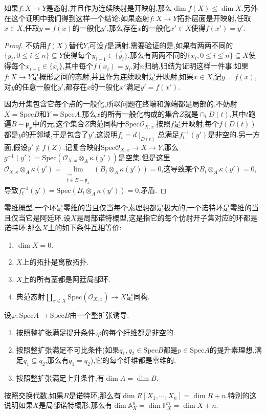 \item 如果$f:X\to Y$是态射,并且作为连续映射是开映射,那么$\dim f(X)\le\dim X$.另外在这个证明中我们得到这样一个结论:如果态射$f:X\to Y$拓扑层面是开映射,任取$x\in X$,任取$y=f(x)$的一般化$y'$,那么存在$x$的一般化$x'\in X$使得$f(x')=y'$.
\begin{proof}
	
	不妨用$f(X)$替代$Y$,可设$f$是满射.需要验证的是,如果有两两不同的$\{y_i,0\le i\le n\}\subseteq Y$使得每个$y_{i-1}\in\overline{\{y_i\}}$,那么有两两不同的$\{x_i,0\le i\le n\}\subseteq X$使得每个$x_{i-1}\in\overline{\{x_i\}}$,其中每个$f(x_i)=y_i$.对$n$归纳,归结为证明这样一件事:如果$f:X\to Y$是概形之间的态射,并且作为连续映射是开映射,如果$x\in X$,记$y=f(x)$,对$y$的任意一般化$y'$,都存在$x$的一般化$x'$满足$y'=f(x')$.
	
	\qquad
	
	因为开集包含它每个点的一般化,所以问题在终端和源端都是局部的,不妨射$X=\mathrm{Spec}B$和$Y=\mathrm{Spec}A$,那么$x$的所有一般化构成的集合$Z$就是$\cap_tD(t)$,其中$t$跑遍$B-\mathfrak{p}_x$中的元,这个集合$Z$典范同构于$\mathrm{Spec}\mathscr{O}_{X,x}$.按照$f$是开映射,每个$f(D(t))$都是$y$的开邻域,于是包含了$y'$,这说明$f_t=d\mid_{D(t)}$总满足$f_t^{-1}(y')$是非空的.另一方面,假设$y'\not\in f(Z)$.记复合映射$\mathrm{Spec}\mathscr{O}_{X,x}\to X\to Y$,那么$g^{-1}(y')=\mathrm{Spec}(\mathscr{O}_{X,x}\otimes_A\kappa(y'))$是空集.但是这里$\mathscr{O}_{X,x}\otimes_A\kappa(y')=\lim\limits_{\substack{\rightarrow\\t\in B-\mathfrak{p}_x}}(B_t\otimes_A\kappa(y'))=0$,这导致某个$B_t\otimes_A\kappa(y')=0$,导致$f_t^{-1}(y')=\mathrm{Spec}(B_t\otimes_A\kappa(y'))=0$,矛盾.
\end{proof}
\item 零维概型.一个环是零维的当且仅当每个素理想都是极大的,一个诺特环是零维的当且仅当它是阿廷环.设$X$是局部诺特概型,这是指它的每个仿射开子集对应的环都是诺特环.那么$X$上的如下条件互相等价:
\begin{enumerate}
	\item $\dim X=0$.
	\item $X$上的拓扑是离散拓扑.
	\item $X$上的所有茎都是阿廷局部环.
	\item 典范态射$\coprod_{x\in X}\mathrm{Spec}(\mathscr{O}_{X,x})\to X$是同构.
\end{enumerate}
\item 设$\varphi:\mathrm{Spec}A\to\mathrm{Spec}B$由一个整扩张诱导.
\begin{enumerate}
	\item 按照整扩张满足提升条件,$\varphi$的每个纤维都是非空的.
	\item 按照整扩张满足不可比条件(如果$q_1,q_2\in\mathrm{Spec}B$都是$p\in\mathrm{Spec}A$的提升素理想,满足$q_1\subseteq q_2$,那么有$q_1=q_2$),它的每个纤维都是零维的.
	\item 按照整扩张满足上升条件,有$\dim A=\dim B$.
\end{enumerate}
\item 按照交换代数,如果$R$是诺特环,那么有$\dim R[X_1,\cdots,X_n]=\dim R+n$.特别的这说明如果$X$是局部诺特概形,那么有$\dim\mathbb{A}_X^n=\dim\mathbb{P}_X^n=\dim X+n$.


